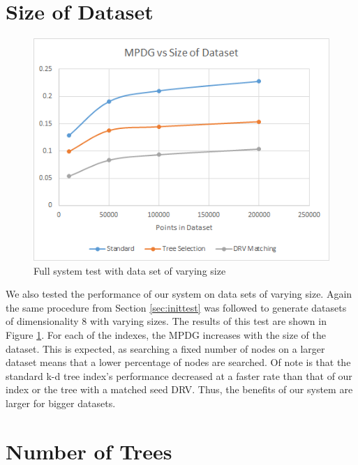 \section{Size of Dataset}

\begin{figure}[h]
\begin{center}
\includegraphics[width=.85\textwidth]{Figures/size}
\end{center}
\caption{Full system test with data set of varying size}
\label{fig:size}
\end{figure}

We also tested the performance of our system on data sets of varying size.  Again the same procedure from Section \ref{sec:inittest} was followed to generate datasets of dimensionality 8 with varying sizes.  The results of this test are shown in Figure \ref{fig:size}.  For each of the indexes, the MPDG increases with the size of the dataset.  This is expected, as searching a fixed number of nodes on a larger dataset means that a lower percentage of nodes are searched.  Of note is that the standard k-d tree index's performance decreased at a faster rate than that of our index or the tree with a matched seed DRV.  Thus, the benefits of our system are larger for bigger datasets. 

\section{Number of Trees}

